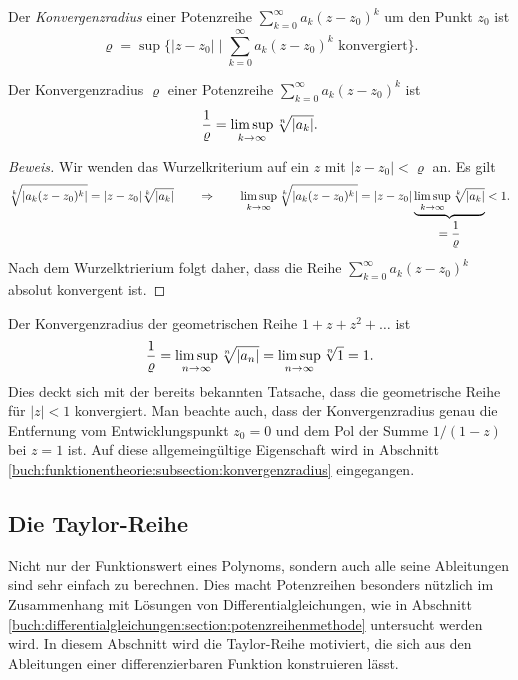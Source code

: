 \begin{definition}
\label{buch:polynome:definition:konvergenzradius}
%
Der {\em Konvergenzradius} einer Potenzreihe $\sum_{k=0}^\infty a_k(z-z_0)^k$
um den Punkt $z_0$ ist 
\[
\varrho = \sup \biggl\{ |z-z_0|\;\bigg|\;
\text{$\displaystyle\sum_{k=0}^\infty a_k(z-z_0)^k$ konvergiert}
\biggr\}.
\]
\end{definition}

\begin{satz}
\label{buch:polynome:satz:konvergenzradius}
Der Konvergenzradius $\varrho$ einer Potenzreihe
$\sum_{k=0}^\infty a_k(z-z_0)^k$ ist
\begin{equation}
\frac{1}{\varrho}
=
\limsup_{k\to\infty} \root{n}\of{|a_k|}.
\label{buch:polynome:eqn:konvergenzradius}
\end{equation}
\end{satz}

\begin{proof}[Beweis]
Wir wenden das Wurzelkriterium auf ein $z$ mit $|z-z_0|<\varrho$ an.
Es gilt
\[
\root{k}\of{|a_k(z-z_0)^k|}
=
|z-z_0|\root{k}\of{|a_k|}
\qquad
\Rightarrow
\qquad
\limsup_{k\to\infty}\root{k}\of{|a_k(z-z_0)^k|}
=
|z-z_0| \underbrace{\limsup_{k\to\infty}\root{k}\of{|a_k|}}_{\displaystyle=\frac{1}{\varrho}}
<
1.
\]
Nach dem Wurzelktrierium folgt daher, dass die Reihe
$\sum_{k=0}^\infty a_k(z-z_0)^k$ absolut konvergent ist.
\end{proof}

\begin{beispiel}
Der Konvergenzradius der geometrischen Reihe $1+z+z^2+\dots$ ist
\[
\frac{1}{\varrho}
=
\limsup_{n\to\infty} \root{n}\of{|a_n|}
=
\limsup_{n\to\infty} \root{n}\of{1}
=
1.
\]
Dies deckt sich mit der bereits bekannten Tatsache, dass die 
geometrische Reihe für $|z|<1$ konvergiert.
Man beachte auch, dass der Konvergenzradius genau die Entfernung
vom Entwicklungspunkt $z_0=0$ und dem Pol der Summe $1/(1-z)$ bei
$z=1$ ist.
Auf diese allgemeingültige Eigenschaft wird in Abschnitt
\ref{buch:funktionentheorie:subsection:konvergenzradius}
eingegangen.
\end{beispiel}

%
%
\subsection{Die Taylor-Reihe
\label{buch:polynome:subsection:taylor-reihe}}
Nicht nur der Funktionswert eines Polynoms, sondern auch alle
seine Ableitungen sind sehr einfach zu berechnen.
Dies macht Potenzreihen besonders nützlich im Zusammenhang
mit Lösungen von Differentialgleichungen, wie in Abschnitt
\ref{buch:differentialgleichungen:section:potenzreihenmethode}
untersucht werden wird.
In diesem Abschnitt wird die Taylor-Reihe motiviert, die sich
aus den Ableitungen einer differenzierbaren Funktion konstruieren
lässt.

